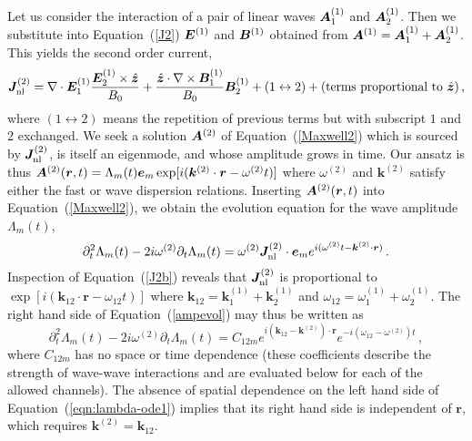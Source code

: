 Let us consider the interaction of a pair of linear waves 
$\boldsymbol{A}^{(1)}_{1}$ and $\boldsymbol{A}^{(1)}_{2}$. 
Then we substitute into Equation~(\ref{J2}) $\boldsymbol{E}^{(1)}$ and $\boldsymbol{B}^{(1)}$ obtained from $\boldsymbol{A}^{(1)}=\boldsymbol{A}^{(1)}_{1}+\boldsymbol{A}^{(1)}_{2}$. This yields the second order current,
\begin{equation}\label{J2b}
	\boldsymbol{J}^{(2)}_{\rm nl} = \nabla\cdot\boldsymbol{E}_1^{(1)}\frac{\boldsymbol{E}_2^{(1)}\times\hat{\boldsymbol{z}}}{B_0} + \frac{\hat{\boldsymbol{z}}\cdot\nabla\times\boldsymbol{B}_1^{(1)}}{B_0}\boldsymbol{B}_2^{(1)} + (1\leftrightarrow 2) + (\mathrm{terms \ proportional \ to \ } \hat{\boldsymbol{z}}) \, ,
\end{equation}
where $(1\leftrightarrow 2)$ means the repetition of previous terms but with subscript $1$ and $2$ exchanged.
We seek a solution $\boldsymbol{A}^{(2)}$ of Equation~(\ref{Maxwell2}) which is sourced by $\boldsymbol{J}_{\rm nl}^{(2)}$, is itself an eigenmode, and whose amplitude grows in time. Our ansatz is thus $\boldsymbol{A}^{(2)}(\boldsymbol{r}, t) = \Lambda_m(t)\boldsymbol{e}_m\exp[i(\boldsymbol{k}^{(2)}\cdot\boldsymbol{r}-\omega^{(2)}t)]$ where $\omega^{(2)}$ and $\boldsymbol{k}^{(2)}$ satisfy either the fast or \alfven wave dispersion relations.
Inserting $\boldsymbol{A}^{(2)}(\boldsymbol{r}, t)$ into Equation~(\ref{Maxwell2}), we obtain the evolution equation for the wave amplitude $\Lambda_m(t)$,
%
\begin{equation}\label{ampevol}
	\partial^2_t \Lambda_m(t) - 2i\omega^{(2)} \partial_t \Lambda_m(t) =\omega^{(2)} \boldsymbol{J}^{(2)}_{\rm nl}\cdot\boldsymbol{e}_m e^{i(\omega^{(2)}t-\boldsymbol{k}^{(2)}\cdot\boldsymbol{r})} \, .
\end{equation}
Inspection of Equation~(\ref{J2b}) reveals that $\boldsymbol{J}^{(2)}_{\rm nl}$ is proportional to $\exp[i(\boldsymbol{k}_{12} \cdot\boldsymbol{r}-\omega_{12} t)]$ where $\boldsymbol{k}_{12}=\boldsymbol{k}_1^{(1)}+\boldsymbol{k}_2^{(1)}$ and $\omega_{12}=\omega_1^{(1)}+\omega_2^{(1)}$. The right hand side of Equation~(\ref{ampevol}) may thus be written as
\begin{equation}\label{eqn:lambda-ode1}
	\partial^2_t \Lambda_m(t) - 2i\omega^{(2)} \partial_t \Lambda_m(t) =C_{12m} e^{i (\boldsymbol{k}_{12}-\boldsymbol{k}^{(2)})\cdot\boldsymbol{r}} e^{-i (\omega_{12}-\omega^{(2)})t}\, ,
\end{equation}
where $C_{12m}$ has no space or time dependence (these coefficients describe the strength of wave-wave interactions and are evaluated below for each of the allowed channels).
The absence of spatial dependence on the left hand side of 
Equation~(\ref{eqn:lambda-ode1}) implies that its right hand side is independent of $\boldsymbol{r}$, which requires $\boldsymbol{k}^{(2)}=\boldsymbol{k}_{12}$.
